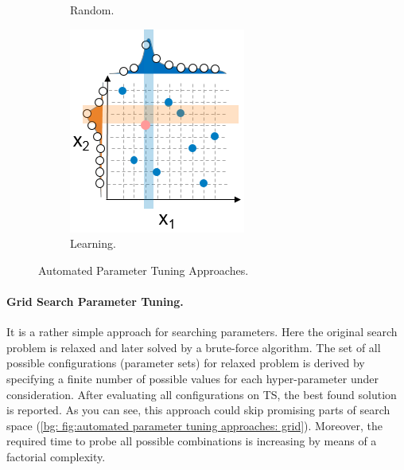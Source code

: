 \begin{figure}
\begin{subfigure}[b]{0.25\linewidth}
		\caption{Random.}
		\label{bg: fig:automated parameter tuning approaches: random}
	\end{subfigure}
	\begin{subfigure}[b]{0.25\linewidth}
		\includegraphics[width=\linewidth]{graphics/Background/hyperparameter-learning-search.png}
		\caption{Learning.}
		\label{bg: fig:automated parameter tuning approaches: learning}
	\end{subfigure}
	\caption{Automated Parameter Tuning Approaches.}
	\label{bg: fig:automated parameter tuning approaches}
\end{figure}

\paragraph{Grid Search Parameter Tuning.} It is a rather simple approach for searching parameters. Here the original search problem is relaxed and later solved by a brute-force algorithm. The set of all possible configurations (parameter sets) for relaxed problem is derived by specifying a finite number of possible values for each hyper-parameter under consideration. After evaluating all configurations on TS, the best found solution is reported. As you can see, this approach could skip promising parts of search space (\cref{bg: fig:automated parameter tuning approaches: grid}). Moreover, the required time to probe all possible combinations is increasing by means of a factorial complexity.

